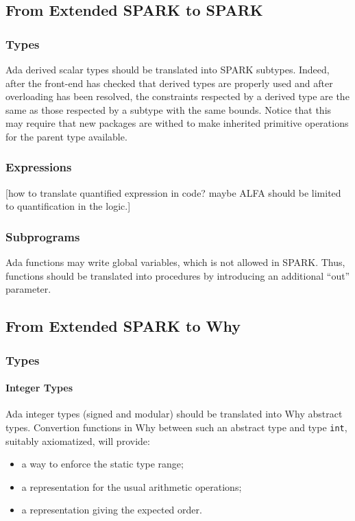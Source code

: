 \documentclass{article}
\begin{document}
\subsection{From Extended SPARK to SPARK}

\subsubsection{Types}

Ada derived scalar types should be translated into SPARK subtypes. Indeed,
after the front-end has checked that derived types are properly used and after
overloading has been resolved, the constraints respected by a derived type are
the same as those respected by a subtype with the same bounds. Notice that this
may require that new packages are withed to make inherited primitive operations
for the parent type available.

\subsubsection{Expressions}

[how to translate quantified expression in code? maybe ALFA should be limited
to quantification in the logic.]

\subsubsection{Subprograms}

Ada functions may write global variables, which is not allowed in SPARK. Thus,
functions should be translated into procedures by introducing an additional
``out'' parameter.

\subsection{From Extended SPARK to Why}

\subsubsection{Types}

\paragraph{Integer Types}

Ada integer types (signed and modular) should be translated into Why abstract
types. Convertion functions in Why between such an abstract type and type
\verb|int|, suitably axiomatized, will provide:
\begin{itemize}
\item a way to enforce the static type range;
\item a representation for the usual arithmetic operations;
\item a representation giving the expected order.
\end{itemize}
\end{document}
